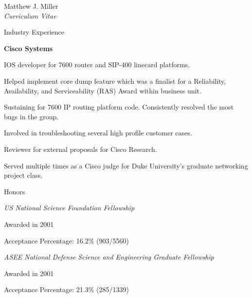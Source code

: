 \documentclass[10pt]{article}
\newenvironment{sublist}{%
    \begin{list}{}{%
        \setlength{\itemsep}{0em}\setlength{\parsep}{0em}%
        \setlength{\topsep}{0em}\setlength{\parskip}{0em}%
    }%
}%
{ \end{list} }
\newenvironment{subbulletlist}{%
    \begin{list}{\labelitemii}{%
        \setlength{\topsep}{\itemsep}\setlength{\parskip}{\parsep}%
    }%
}%
{ \end{list} }
\begin{document}
\begin{cv}{Matthew J. Miller\\{\large \itshape Curriculum Vitae}}
\setlength{\oldcvlabelwidth}{\cvlabelwidth}
\setlength{\cvlabelwidth}{1em}
\begin{cvlist}{Industry Experience}
    \item \textbf{Cisco Systems}
    \begin{subbulletlist}
        \item IOS developer for 7600 router and SIP-400 linecard
        platforms.
        \item Helped implement core dump feature which was a finalist
        for a Reliability, Availability, and Serviceability (RAS) Award
        within business unit.
        \item Sustaining for 7600 IP routing platform code.
        Consistently resolved the most bugs in the group.
        \item Involved in troubleshooting several high profile
        customer cases.
        \item Reviewer for external proposals for Cisco Research.
        \item Served multiple times as a Cisco judge for Duke
        University's graduate networking project class.
    \end{subbulletlist}
\end{cvlist}
\setlength{\cvlabelwidth}{\oldcvlabelwidth}

\begin{cvlist}{Honors}
\item%
    \emph{US National Science Foundation Fellowship}
    \begin{sublist}
    \item Awarded in 2001
    \item Acceptance Percentage: 16.2\% (903/5560)
    \end{sublist}
\item%
    \emph{ASEE National Defense Science and 
    Engineering Graduate Fellowship}
    \begin{sublist}
    \item Awarded in 2001
    \item Acceptance Percentage: 21.3\% (285/1339)
    \end{sublist}
\end{cvlist}



\end{cv}
\end{document}
